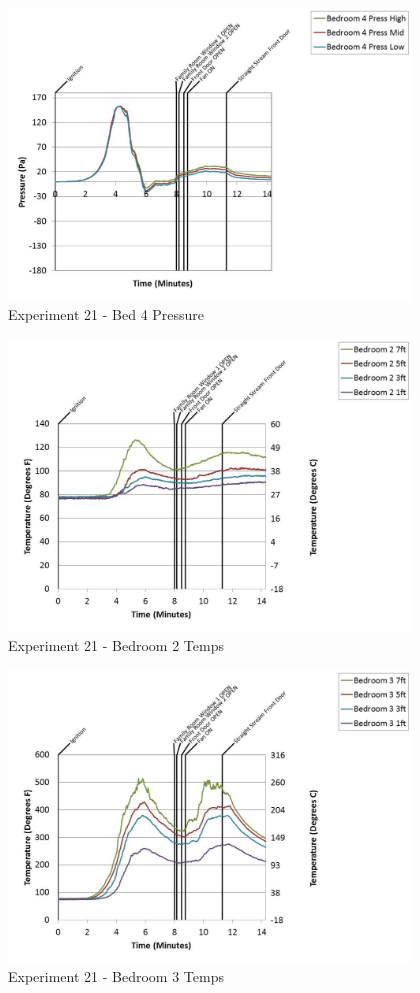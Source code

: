 \documentclass{article}
\begin{document}
\begin{appendices}
	\clearpage

	\begin{figure}[h!]
		\centering
		\includegraphics[height=3.05in]{0_Images/Results_Charts/Exp_21_Charts/Bed4Pressure.pdf}
		\caption{Experiment 21 - Bed 4 Pressure}
	\end{figure}
 

	\begin{figure}[h!]
		\centering
		\includegraphics[height=3.05in]{0_Images/Results_Charts/Exp_21_Charts/Bedroom2Temps.pdf}
		\caption{Experiment 21 - Bedroom 2 Temps}
	\end{figure}
 
	\clearpage

	\begin{figure}[h!]
		\centering
		\includegraphics[height=3.05in]{0_Images/Results_Charts/Exp_21_Charts/Bedroom3Temps.pdf}
		\caption{Experiment 21 - Bedroom 3 Temps}
	\end{figure}
 


\end{appendices}
\end{document}
